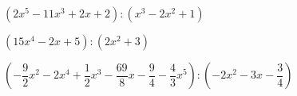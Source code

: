 \begin{esercizio}[\Ast]
\begin{enumeratea}
 \item $\left(2x^{5}-11x^{3}+2x+2\right):\left(x^{3}-2x^{2}+1\right)$
 \item $\left(15x^{4}-2x+5\right):\left(2x^{2}+3\right)$
 \item $\left(-{\dfrac{9}{2}}x^{2}-2x^{4}+\dfrac{1}{2}x^{3}-
                \dfrac{69}{8}x-\dfrac{9}{4}-\dfrac{4}{3}x^{5}\right):
                  \left(-2x^{2}-3x-\dfrac{3}{4}\right)$
 \end{enumeratea}
\end{esercizio}

% 
% 
% 


